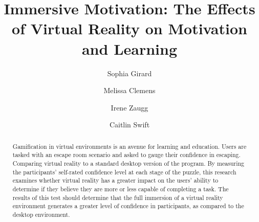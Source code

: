 \documentclass[manuscript,screen,review]{acmart}
\begin{document}
\title{Immersive Motivation: The Effects of Virtual Reality on Motivation and Learning}

\author{Sophia Girard}

\author{Melissa Clemens}

\author{Irene Zaugg}

\author{Caitlin Swift}


\begin{abstract}
Gamification in virtual environments is an avenue for learning and education. Users are tasked with an escape room scenario and asked to gauge their confidence in escaping. Comparing virtual reality to a standard desktop version of the program. By measuring the participants' self-rated confidence level at each stage of the puzzle, this research examines whether virtual reality has a greater impact on the users' ability to determine if they believe they are more or less capable of completing a task. The results of this test should determine that the full immersion of a virtual reality environment generates a greater level of confidence in participants, as compared to the desktop environment.
\end{abstract}
\end{document}
